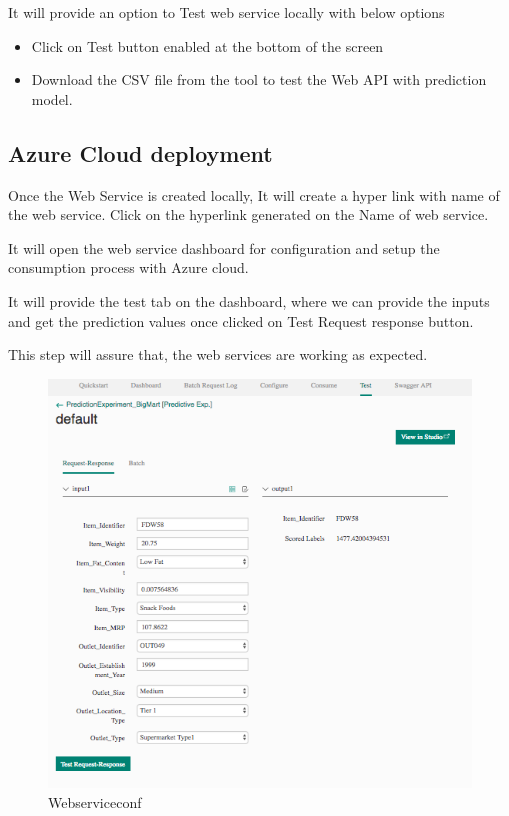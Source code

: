 It will provide an option to Test web service locally with below options
\begin{itemize}
\item Click on Test button enabled at the bottom of the screen
\item Download the CSV file from the tool to test the Web API 
with prediction model.
\end{itemize}

\subsection{Azure Cloud deployment}
Once the Web Service is created locally, It will create a hyper link with 
name of the web service. 
Click on the hyperlink generated on the Name of web service.

It will open the web service dashboard for configuration and setup the 
consumption process with Azure cloud.

It will provide the test tab on the dashboard, where we can provide the 
inputs and get the prediction values once clicked on Test Request response 
button.

This step will assure that, the web services are working as expected.

\begin{figure}[pic7]
\centering
\includegraphics[width=\columnwidth]{Images/mlstudio/Webserviceconf.png}
\caption{Webserviceconf}\label{fig:Webserviceconf}
\end{figure}

